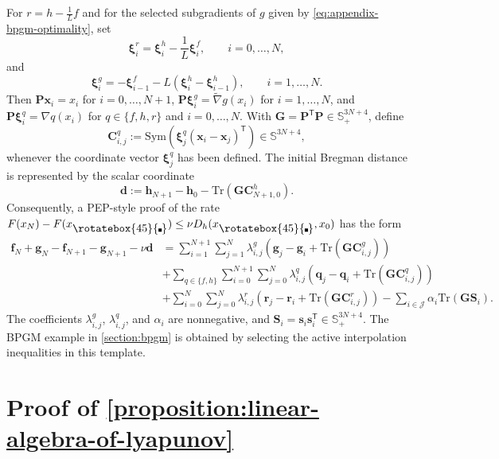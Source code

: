 \documentclass{article}
\theoremstyle{definition}
\theoremstyle{plain}
\newcommand{\vxi}{{\boldsymbol{\xi}}}
\newcommand{\vd}{{\mathbf{d}}}
\newcommand{\vf}{{\mathbf{f}}}
\newcommand{\vg}{{\mathbf{g}}}
\newcommand{\vh}{{\mathbf{h}}}
\newcommand{\vq}{{\mathbf{q}}}
\newcommand{\vr}{{\mathbf{r}}}
\newcommand{\vs}{{\mathbf{s}}}
\newcommand{\vx}{{\mathbf{x}}}
\newcommand{\vC}{{\mathbf{C}}}
\newcommand{\vG}{{\mathbf{G}}}
\newcommand{\vP}{{\mathbf{P}}}
\newcommand{\vS}{{\mathbf{S}}}
\newcommand{\cJ}{{\mathcal{J}}}
\newcommand{\tnabla}{\widetilde{\nabla}}
\newcommand{\transpose}{\mathsf{T}}
\newcommand{\compidx}{%
  \mathord{\mathchoice
    {\vcenter{\hbox{\rotatebox{45}{\rule{0.39em}{0.39em}}}}}
    {\vcenter{\hbox{\rotatebox{45}{\rule{0.39em}{0.39em}}}}}
    {\vcenter{\hbox{\rotatebox{45}{\rule{0.29em}{0.29em}}}}}
    {\vcenter{\hbox{\rotatebox{45}{\rule{0.23em}{0.23em}}}}}}%
}
\newcommand{\bregsm}{f}
\newcommand{\bregprox}{g}
\newcommand{\bregaux}{r}
\newcommand{\vbregsm}{\vf}
\newcommand{\vbregprox}{\vg}
\newcommand{\vbregaux}{\vr}
\begin{document}
For $\bregaux=h-\frac{1}{L}\bregsm$ and for the selected subgradients of $\bregprox$ given by \eqref{eq:appendix-bpgm-optimality}, set
\[
    \vxi_i^{\bregaux}=\vxi_i^h-\frac{1}{L}\vxi_i^{\bregsm},
    \qquad i=0,\dots,N,
\]
and
\[
    \vxi_i^{\bregprox}=-\vxi_{i-1}^{\bregsm}-L\left(\vxi_i^h-\vxi_{i-1}^h\right),
    \qquad i=1,\dots,N.
\]
Then $\vP\vx_i=x_i$ for $i=0,\dots,N+1$, $\vP\vxi_i^{\bregprox}=\tnabla \bregprox(x_i)$ for $i=1,\dots,N$, and $\vP\vxi_i^q=\nabla q(x_i)$ for $q\in\{\bregsm,h,\bregaux\}$ and $i=0,\dots,N$.
With $\vG=\vP^\transpose\vP\in\mathbb{S}_+^{3N+4}$, define
\[
    \vC_{i,j}^q
    :=
    \mathrm{Sym}\left(\vxi_j^q(\vx_i-\vx_j)^\transpose\right)\in\mathbb{S}^{3N+4},
\]
whenever the coordinate vector $\vxi_j^q$ has been defined.
The initial Bregman distance is represented by the scalar coordinate
\[
    \vd
    :=
    \vh_{N+1}-\vh_0-\mathrm{Tr}\left(\vG\vC_{N+1,0}^h\right).
\]
Consequently, a PEP-style proof of the rate
$F(x_N)-F(x_{\compidx})\le\nu D_h(x_{\compidx},x_0)$ has the form
\[
\begin{aligned}
    \vbregsm_N+\vbregprox_N-\vbregsm_{N+1}-\vbregprox_{N+1}
    -\nu\vd
    &=
    \sum_{i=1}^{N+1}\sum_{j=1}^{N}
    \lambda_{i,j}^{\bregprox}
    \left(\vbregprox_j-\vbregprox_i+\mathrm{Tr}\left(\vG\vC_{i,j}^{\bregprox}\right)\right) \\
    &
    +\sum_{q\in\{\bregsm,h\}}\sum_{i=0}^{N+1}\sum_{j=0}^{N}
    \lambda_{i,j}^q
    \left(\vq_j-\vq_i+\mathrm{Tr}\left(\vG\vC_{i,j}^q\right)\right) \\
    &    
    +\sum_{i=0}^{N}\sum_{j=0}^{N}
    \lambda_{i,j}^{\bregaux}
    \left(\vbregaux_j-\vbregaux_i+\mathrm{Tr}\left(\vG\vC_{i,j}^{\bregaux}\right)\right) 
    -\sum_{i\in\cJ}\alpha_i\mathrm{Tr}(\vG\vS_i).
\end{aligned}
\]
The coefficients $\lambda_{i,j}^{\bregprox}$, $\lambda_{i,j}^q$, and $\alpha_i$ are nonnegative, and $\vS_i=\vs_i\vs_i^\transpose\in\mathbb{S}_+^{3N+4}$.
The BPGM example in \cref{section:bpgm} is obtained by selecting the active interpolation inequalities in this template.

\section{Proof of \cref{proposition:linear-algebra-of-lyapunov}}
\label{appendix:lyapunov-proposition-proof}
\end{document}
